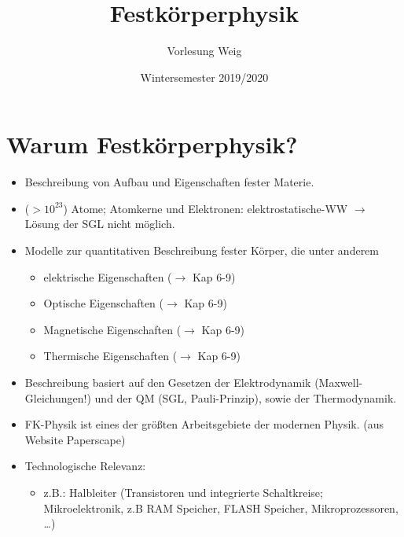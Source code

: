 


\title{Festkörperphysik}
\author{Vorlesung Weig}
\date{Wintersemester 2019/2020}



\maketitle \newpage
\tableofcontents
\newpage

\section*{Warum Festkörperphysik?}
	\begin{itemize}
	    \item Beschreibung von Aufbau und Eigenschaften fester Materie.
	    \item ($>10^{23}$) Atome; Atomkerne und Elektronen: elektrostatische-WW $ \rightarrow $ Lösung der SGL nicht möglich.
	    \item Modelle zur quantitativen Beschreibung fester Körper, die unter anderem
	    \begin{itemize}
	        \item elektrische Eigenschaften ($\rightarrow$ Kap 6-9)%
	        \item Optische Eigenschaften ($\rightarrow$ Kap 6-9)%
	        \item Magnetische Eigenschaften ($\rightarrow$ Kap 6-9)%
	        \item Thermische Eigenschaften ($\rightarrow$ Kap 6-9)%
	    \end{itemize}
	    \item Beschreibung basiert auf den Gesetzen der Elektrodynamik (Maxwell-Gleichungen!) und der QM (SGL, Pauli-Prinzip), sowie der Thermodynamik.
	    \item FK-Physik ist eines der größten Arbeitsgebiete der modernen Physik. (aus Website Paperscape)
	    \item Technologische Relevanz:
	    \begin{itemize}
	        \item z.B.: Halbleiter (Transistoren und integrierte Schaltkreise; Mikroelektronik, z.B RAM Speicher, FLASH Speicher, Mikroprozessoren, \dots)

\end{itemize}
\end{itemize}
